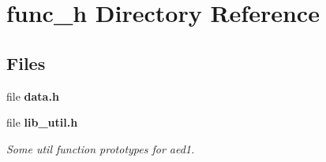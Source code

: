 \section{func\+\_\+h Directory Reference}
\label{dir_3d10083c2064d7f9b406e4a4aa528ebc}
\subsection*{Files}
\begin{DoxyCompactItemize}
\item 
file {\bf data.\+h}
\item 
file {\bf lib\+\_\+util.\+h}
\begin{DoxyCompactList}\small\item\em Some util function prototypes for aed1. \end{DoxyCompactList}\end{DoxyCompactItemize}
